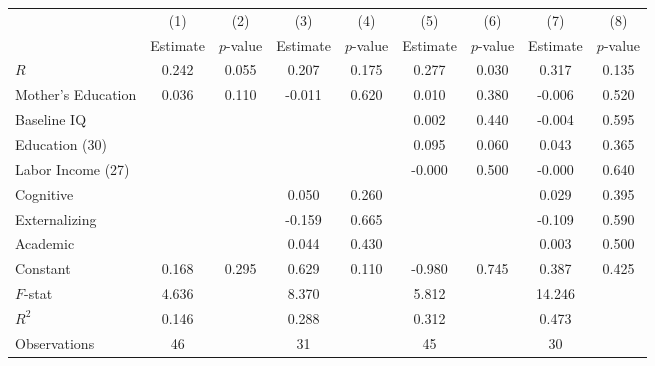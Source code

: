 \begin{tabular}{lcccccccc} \toprule
 & (1) & (2) & (3) & (4) & (5) & (6) & (7) & (8) \\ 
 & Estimate  & $p$-value  & Estimate  & $p$-value  & Estimate  & $p$-value  & Estimate  & $p$-value  \\  \midrule
$R$ &     0.242 &     0.055 &     0.207 &     0.175 &     0.277 &     0.030 &     0.317 &     0.135 \\  
Mother's Education &     0.036 &     0.110 &    -0.011 &     0.620 &     0.010 &     0.380 &    -0.006 &     0.520 \\  
Baseline IQ &         &         &         &         &     0.002 &     0.440 &    -0.004 &     0.595 \\  
Education (30) &         &         &         &         &     0.095 &     0.060 &     0.043 &     0.365 \\  
Labor Income (27) &         &         &         &         &    -0.000 &     0.500 &    -0.000 &     0.640 \\  
Cognitive &         &         &     0.050 &     0.260 &         &         &     0.029 &     0.395 \\  
Externalizing &         &         &    -0.159 &     0.665 &         &         &    -0.109 &     0.590 \\  
Academic &         &         &     0.044 &     0.430 &         &         &     0.003 &     0.500 \\  
Constant &     0.168 &     0.295 &     0.629 &     0.110 &    -0.980 &     0.745 &     0.387 &     0.425 \\  \midrule
$F$-stat &     4.636 &         &     8.370 &         &     5.812 &         &    14.246 &         \\  
$R^2$ &     0.146 &         &     0.288 &         &     0.312 &         &     0.473 &         \\  
Observations &    46 &         &    31 &         &    45 &         &    30 &         \\  
\bottomrule
\end{tabular}

